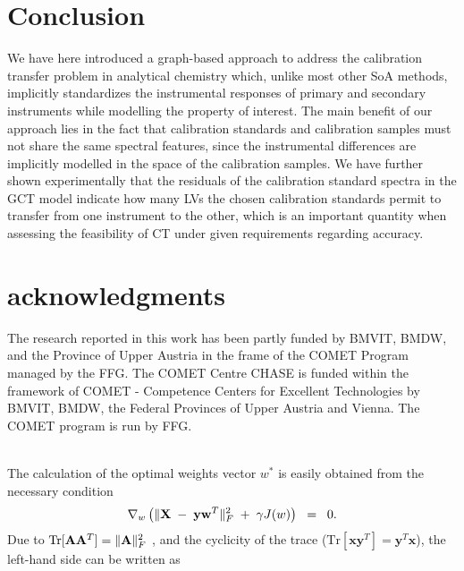 \documentclass{article}
\DeclarePairedDelimiter{\normtwo}{\lVert}{\rVert}
\let\vec\mathbf
\begin{document}
\section{Conclusion}
We have here introduced a graph-based approach to address the calibration transfer problem in analytical chemistry which, unlike most other SoA methods, implicitly standardizes the instrumental responses of primary and secondary instruments while modelling the property of interest. The main benefit of our approach lies in the fact that calibration standards and calibration samples must not share the same spectral features, since the instrumental differences are implicitly modelled in the space of the calibration samples. We have further shown experimentally that the residuals of the calibration standard spectra in the GCT model indicate how many LVs the chosen calibration standards permit to transfer from one instrument to the other, which is an important quantity when assessing the feasibility of CT under given requirements regarding accuracy.

\section*{acknowledgments}
The research reported in this work has been partly funded by BMVIT, BMDW, and the Province of Upper Austria in the frame of the COMET Program managed by the FFG. The COMET Centre CHASE is funded within the framework of COMET - Competence Centers for Excellent Technologies by BMVIT, BMDW, the Federal Provinces of Upper Austria and Vienna. The COMET program is run by FFG.


  



\\

\noindent The calculation of the optimal weights vector $w^*$ is easily obtained from the necessary condition 
\begin{eqnarray}
\nabla_w\left(\normtwo{\vec X \;-\;\vec y\vec w^T}_F^2\;+\;\gamma J(w)\right)\;\;=\;\;0.
\end{eqnarray}
Due to $\textrm{Tr}[\vec A \vec A^T]=\normtwo{\vec A}_F^2$ , and the cyclicity of the trace ($\textrm{Tr}[\vec x \vec y^T] = \vec y^T \vec x$), the left-hand side can be written as
\end{document}
